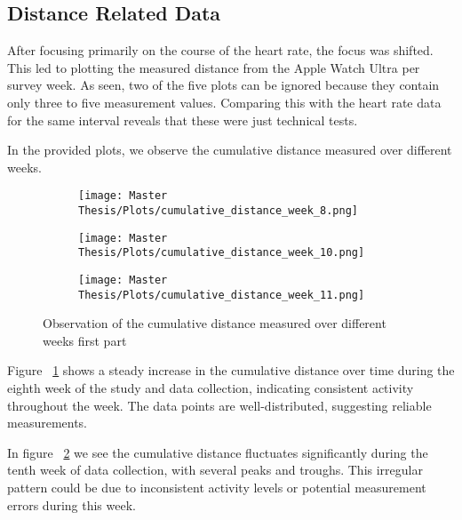 \subsection{Distance Related Data}

After focusing primarily on the course of the heart rate, the focus was shifted. This led to plotting the measured distance from the Apple Watch Ultra per survey week. As seen, two of the five plots can be ignored because they contain only three to five measurement values. Comparing this with the heart rate data for the same interval reveals that these were just technical tests.

In the provided plots, we observe the cumulative distance measured over different weeks.

\FloatBarrier
\begin{figure}[h!]
  \centering
  \begin{subfigure}{.55\textwidth}
    \centering
    \texttt{[image: Master Thesis/Plots/cumulative\_distance\_week\_8.png]}
    \caption{}
    \label{fig:distrel1}
  \end{subfigure}%
  \begin{subfigure}{.55\textwidth}
    \centering
    \texttt{[image: Master Thesis/Plots/cumulative\_distance\_week\_10.png]}
    \caption{}
    \label{fig:distrel2}
  \end{subfigure}
  \newline
  \begin{subfigure}{.55\textwidth}
    \centering
    \texttt{[image: Master Thesis/Plots/cumulative\_distance\_week\_11.png]}
    \caption{}
    \label{fig:distrel3}
  \end{subfigure}%
  \caption{Observation of the cumulative distance measured over different weeks first part}
    \label{fig:distcumfirstpart}
\end{figure}
\FloatBarrier

Figure ~\ref{fig:distrel1} shows a steady increase in the cumulative distance over time during the eighth week of the study and data collection, indicating consistent activity throughout the week. The data points are well-distributed, suggesting reliable measurements.

In figure ~\ref{fig:distrel2} we see the cumulative distance fluctuates significantly during the tenth week of data collection, with several peaks and troughs. This irregular pattern could be due to inconsistent activity levels or potential measurement errors during this week.

